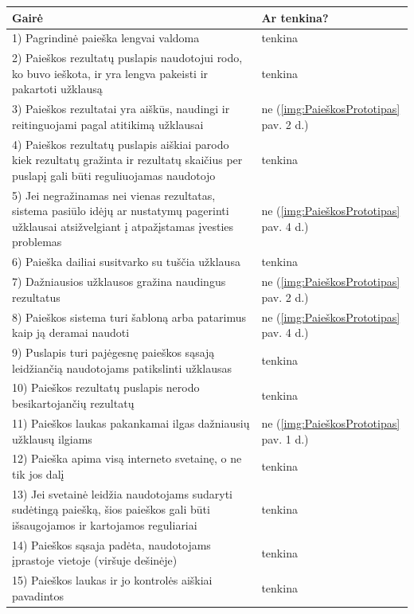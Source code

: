 \documentclass{VUMIFPSbakalaurinis}
\begin{document}
\begin{center}
\begin{tabular}{ |p{13cm}|p{}| } 
 \hline
	Gairė & Ar tenkina? \\ \hline
	1) Pagrindinė paieška lengvai valdoma & tenkina \\ \hline
	2) Paieškos rezultatų puslapis naudotojui rodo, ko buvo ieškota, ir yra lengva pakeisti ir pakartoti užklausą & tenkina \\ \hline
	3) Paieškos rezultatai yra aiškūs, naudingi ir reitinguojami pagal atitikimą užklausai & ne (\ref{img:PaieškosPrototipas} pav. 2 d.) \\ \hline
	4) Paieškos rezultatų puslapis aiškiai parodo kiek rezultatų gražinta ir rezultatų skaičius per puslapį gali būti reguliuojamas naudotojo & tenkina \\ \hline
	5) Jei negražinamas nei vienas rezultatas, sistema pasiūlo idėjų ar nustatymų pagerinti užklausai atsižvelgiant į atpažįstamas įvesties problemas & ne (\ref{img:PaieškosPrototipas} pav. 4 d.) \\ \hline
	6) Paieška dailiai susitvarko su tuščia užklausa & tenkina \\ \hline
	7) Dažniausios užklausos gražina naudingus rezultatus & ne (\ref{img:PaieškosPrototipas} pav. 2 d.) \\ \hline
	8) Paieškos sistema turi šabloną arba patarimus kaip ją deramai naudoti & ne (\ref{img:PaieškosPrototipas} pav. 4 d.) \\ \hline
	9) Puslapis turi pajėgesnę paieškos sąsają leidžiančią naudotojams patikslinti užklausas & tenkina \\ \hline
	10) Paieškos rezultatų puslapis nerodo besikartojančių rezultatų & tenkina \\ \hline
	11) Paieškos laukas pakankamai ilgas dažniausių užklausų ilgiams & ne (\ref{img:PaieškosPrototipas} pav. 1 d.) \\ \hline
	12) Paieška apima visą interneto svetainę, o ne tik jos dalį & tenkina \\ \hline
	13) Jei svetainė leidžia naudotojams sudaryti sudėtingą paiešką, šios paieškos gali būti išsaugojamos ir kartojamos reguliariai & tenkina \\ \hline
	14) Paieškos sąsaja padėta, naudotojams įprastoje vietoje (viršuje dešinėje) & tenkina \\ \hline
	15) Paieškos laukas ir jo kontrolės aiškiai pavadintos & tenkina \\ \hline

\end{tabular}
\end{center}
\end{document}
